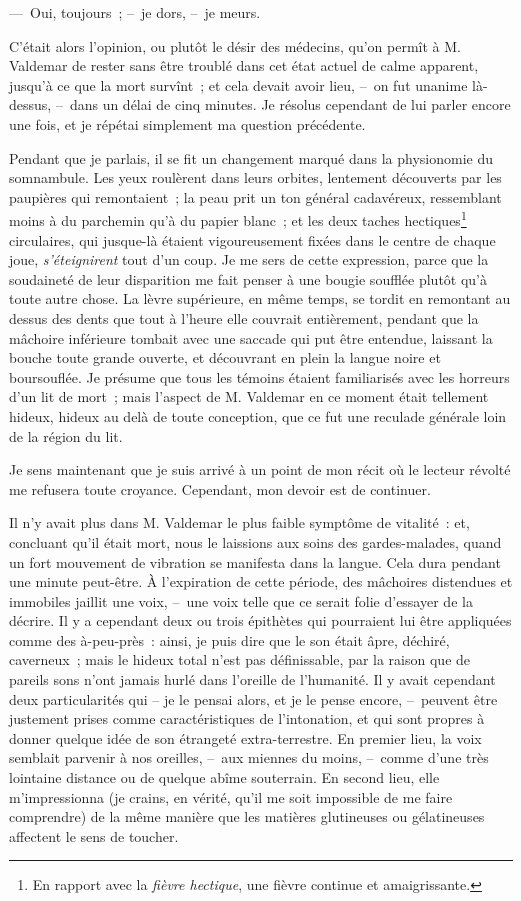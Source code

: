 \documentclass[french,twoside]{book} %
\begin{document}
— Oui, toujours ; – je dors, – je meurs.\par
C’était alors l’opinion, ou plutôt le désir des médecins, qu’on permît à M. Valdemar de rester sans être troublé dans cet état actuel de calme apparent, jusqu’à ce que la mort survînt ; et cela devait avoir lieu, – on fut unanime là-dessus, – dans un délai de cinq minutes. Je résolus cependant de lui parler encore une fois, et je répétai simplement ma question précédente.\par
Pendant que je parlais, il se fit un changement marqué dans la physionomie du somnambule. Les yeux roulèrent dans leurs orbites, lentement découverts par les paupières qui remontaient ; la peau prit un ton général cadavéreux, ressemblant moins à du parchemin qu’à du papier blanc ; et les deux taches hectiques\footnote{En rapport avec la \emph{fièvre hectique}, une fièvre continue et amaigrissante.} circulaires, qui jusque-là étaient vigoureusement fixées dans le centre de chaque joue, \emph{s’éteignirent} tout d’un coup. Je me sers de cette expression, parce que la soudaineté de leur disparition me fait penser à une bougie soufflée plutôt qu’à toute autre chose. La lèvre supérieure, en même temps, se tordit en remontant au dessus des dents que tout à l’heure elle couvrait entièrement, pendant que la mâchoire inférieure tombait avec une saccade qui put être entendue, laissant la bouche toute grande ouverte, et découvrant en plein la langue noire et boursouflée. Je présume que tous les témoins étaient familiarisés avec les horreurs d’un lit de mort ; mais l’aspect de M. Valdemar en ce moment était tellement hideux, hideux au delà de toute conception, que ce fut une reculade générale loin de la région du lit.\par
Je sens maintenant que je suis arrivé à un point de mon récit où le lecteur révolté me refusera toute croyance. Cependant, mon devoir est de continuer.\par
Il n’y avait plus dans M. Valdemar le plus faible symptôme de vitalité : et, concluant qu’il était mort, nous le laissions aux soins des gardes-malades, quand un fort mouvement de vibration se manifesta dans la langue. Cela dura pendant une minute peut-être. À l’expiration de cette période, des mâchoires distendues et immobiles jaillit une voix, – une voix telle que ce serait folie d’essayer de la décrire. Il y a cependant deux ou trois épithètes qui pourraient lui être appliquées comme des à-peu-près : ainsi, je puis dire que le son était âpre, déchiré, caverneux ; mais le hideux total n’est pas définissable, par la raison que de pareils sons n’ont jamais hurlé dans l’oreille de l’humanité. Il y avait cependant deux particularités qui – je le pensai alors, et je le pense encore, – peuvent être justement prises comme caractéristiques de l’intonation, et qui sont propres à donner quelque idée de son étrangeté extra-terrestre. En premier lieu, la voix semblait parvenir à nos oreilles, – aux miennes du moins, – comme d’une très lointaine distance ou de quelque abîme souterrain. En second lieu, elle m’impressionna (je crains, en vérité, qu’il me soit impossible de me faire comprendre) de la même manière que les matières glutineuses ou gélatineuses affectent le sens de toucher.\par
\end{document}
